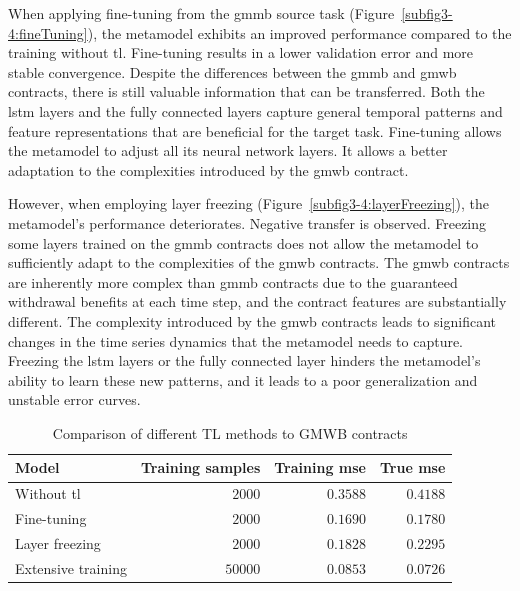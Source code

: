 When applying fine-tuning from the \gls{gmmb} source task (Figure~\ref{subfig3-4:fineTuning}), the metamodel exhibits an improved performance compared to the training without \gls{tl}. 
Fine-tuning results in a lower validation error and more stable convergence.
Despite the differences between the \gls{gmmb} and \gls{gmwb} contracts, there is still valuable information that can be transferred. 
Both the \gls{lstm} layers and the fully connected layers capture general temporal patterns and feature representations that are beneficial for the target task. 
Fine-tuning allows the metamodel to adjust all its neural network layers. 
It allows a better adaptation to the complexities introduced by the \gls{gmwb} contract.

However, when employing layer freezing (Figure~\ref{subfig3-4:layerFreezing}), the metamodel's performance deteriorates.
Negative transfer is observed.
Freezing some layers trained on the \gls{gmmb} contracts does not allow the metamodel to sufficiently adapt to the complexities of the \gls{gmwb} contracts. 
The \gls{gmwb} contracts are inherently more complex than \gls{gmmb} contracts due to the guaranteed withdrawal benefits at each time step, and the contract features are substantially different.
The complexity introduced by the \gls{gmwb} contracts leads to significant changes in the time series dynamics that the metamodel needs to capture.
Freezing the \gls{lstm} layers or the fully connected layer hinders the metamodel's ability to learn these new patterns, and it leads to a poor generalization and unstable error curves.

\begin{table}[ht!]
    \centering
    \begin{tabular}{lrrr}
        \toprule
        \textbf{Model} & \textbf{Training samples} & \textbf{Training \gls{mse}} & \textbf{True \gls{mse}} \\
        \midrule
        Without \gls{tl} & $\num{2000}$ & $0.3588$ & $0.4188$ \\
        Fine-tuning & $\num{2000}$ & $0.1690$ & $0.1780$ \\
        Layer freezing & $\num{2000}$ & $0.1828$ & $0.2295$ \\
        Extensive training & $\num{50000}$ & $0.0853$ & $0.0726$ \\
        \bottomrule
    \end{tabular}
    \caption{Comparison of different TL methods to GMWB contracts}
    \label{tab3:transfer_learning_results_gmwb}
\end{table}

